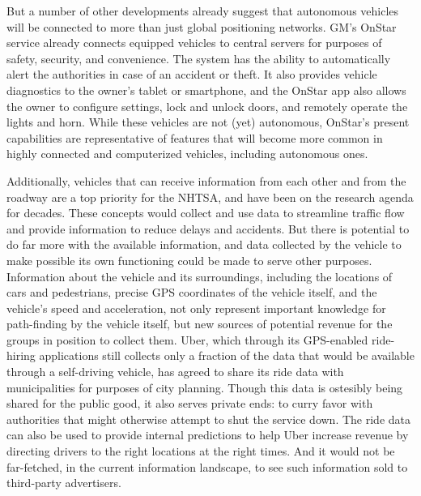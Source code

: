 But a number of other developments already suggest that autonomous
vehicles will be connected to more than just global positioning
networks. GM's OnStar service already connects equipped vehicles to central servers for
purposes of safety, security, and convenience. The system has the
ability to automatically alert the authorities in case of an accident
or theft. It also provides vehicle diagnostics to the owner's tablet
or smartphone, and the OnStar app also allows the owner to configure settings, lock and
unlock doors, and remotely operate the lights and horn.\cite{onstar}
While these vehicles are not (yet) autonomous, OnStar's present
capabilities are representative of features that will become more common in highly
connected and computerized vehicles, including autonomous ones.

Additionally, vehicles that can receive information from each other and from the
roadway are a top priority for the NHTSA, and have been on the
research agenda for decades.\cite[p. 11]{wetmore} These concepts would
collect and use data to streamline traffic flow and provide
information to reduce delays and accidents. But there is potential to
do far more with the available information,
and data collected by the vehicle to make possible its own functioning
could be made to serve other purposes. Information about the vehicle
and its surroundings, including the locations of cars and pedestrians,
precise GPS coordinates of the vehicle itself, and the vehicle's speed
and acceleration, not only represent important knowledge for
path-finding by the vehicle itself, but new sources of potential
revenue for the groups in position to collect them. Uber, which
through its GPS-enabled ride-hiring applications still collects only a
fraction of the data that would be available through a self-driving
vehicle, has agreed to share its ride data with municipalities for purposes of
city planning.\cite{uberJardin} Though this data is ostesibly being
shared for the public good, it also serves private ends: to curry favor with
authorities that might otherwise attempt to shut the service down. The
ride data can also be used to provide internal predictions to help
Uber increase revenue by directing drivers to the right locations at
the right times. And it would not be far-fetched, in the current
information landscape, to see such information sold to third-party advertisers.


